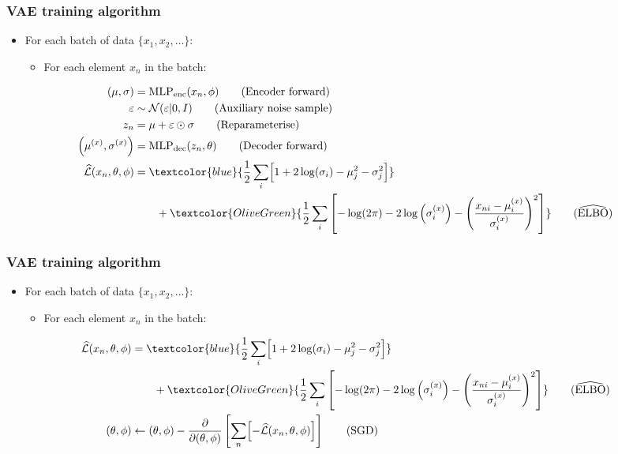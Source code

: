 \documentclass[xcolor=table,dvipsnames]{beamer}
\begin{document}
\begin{frame}
    \frametitle{VAE training algorithm}
    \begin{itemize}
        \item For each batch of data $\{x_1,x_2,\dots\}$:
        \begin{itemize}
            \item For each element $x_n$ in the batch:
        \end{itemize}
    \end{itemize}
    \begin{align*}
        (\mu, \sigma) &= \text{MLP}_\text{enc}(x_n, \phi) \tag{Encoder forward} \\
        \varepsilon &\sim \mathcal{N}(\varepsilon \vert 0, I) \tag{Auxiliary noise sample} \\
        z_n &= \mu + \varepsilon \odot \sigma \tag{Reparameterise} \\
        \left(\mu^{(x)}, \sigma^{(x)}\right) &= \text{MLP}_\text{dec}(z_n, \theta) \tag{Decoder forward} \\
        \widehat{\mathcal{L}}(x_n, \theta, \phi) &= \textcolor{blue}{\frac{1}{2}\sum_i \Bigl[ 1 + 2\log(\sigma_i) - \mu_j^2 - \sigma_j^2 \Bigr]} \\
        &\qquad + \textcolor{OliveGreen}{\frac{1}{2}\sum_i\left[ -\log(2\pi) - 2\log\left( \sigma^{(x)}_i \right) - \left(\frac{x_{ni}-\mu^{(x)}_i}{\sigma^{(x)}_i}\right)^2 \right]} \tag{$\widehat{\text{ELBO}}$}
    \end{align*}
\end{frame}

\begin{frame}
    \frametitle{VAE training algorithm}
    \begin{itemize}
        \item For each batch of data $\{x_1,x_2,\dots\}$:
        \begin{itemize}
            \item For each element $x_n$ in the batch:
        \end{itemize}
    \end{itemize}
    \begin{align*}
        \widehat{\mathcal{L}}(x_n, \theta, \phi) &= \textcolor{blue}{\frac{1}{2}\sum_i \Bigl[ 1 + 2\log(\sigma_i) - \mu_j^2 - \sigma_j^2 \Bigr]} \\
        &\qquad + \textcolor{OliveGreen}{\frac{1}{2}\sum_i\left[ -\log(2\pi) - 2\log\left( \sigma^{(x)}_i \right) - \left(\frac{x_{ni}-\mu^{(x)}_i}{\sigma^{(x)}_i}\right)^2 \right]} \tag{$\widehat{\text{ELBO}}$} \\
        (\theta, \phi) &\leftarrow (\theta, \phi) - \frac{\partial}{\partial (\theta, \phi)} \left[\sum_n \Bigl[ -\widehat{\mathcal{L}}(x_n, \theta, \phi) \Bigr]\right] \tag{SGD}
    \end{align*}
\end{frame}
\end{document}
